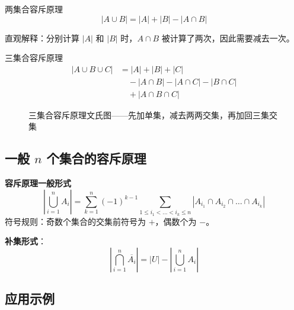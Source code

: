 \begin{myTheorem}{两集合容斥原理}
\[|A \cup B| = |A| + |B| - |A \cap B|\]
\end{myTheorem}

直观解释：分别计算 $|A|$ 和 $|B|$ 时，$A \cap B$ 被计算了两次，因此需要减去一次。

\begin{myTheorem}{三集合容斥原理}
\[
\begin{aligned}
|A \cup B \cup C| &= |A| + |B| + |C| \\
&\quad - |A \cap B| - |A \cap C| - |B \cap C| \\
&\quad + |A \cap B \cap C|
\end{aligned}
\]
\end{myTheorem}

\begin{figure}[H]
\centering
{}
\caption{三集合容斥原理文氏图——先加单集，减去两两交集，再加回三集交集}
\end{figure}

\subsection{一般 $n$ 个集合的容斥原理}

\begin{myformula}
\textbf{容斥原理一般形式}
\[
\left|\bigcup_{i=1}^{n} A_i\right| = \sum_{k=1}^{n} (-1)^{k-1} \sum_{1 \leq i_1 < \dots < i_k \leq n} |A_{i_1} \cap A_{i_2} \cap \dots \cap A_{i_k}|
\]
符号规则：奇数个集合的交集前符号为 $+$，偶数个为 $-$。
\end{myformula}

\textbf{补集形式}：
\[
\left|\bigcap_{i=1}^{n} \overline{A_i}\right| = |U| - \left|\bigcup_{i=1}^{n} A_i\right|
\]

\subsection{应用示例}

